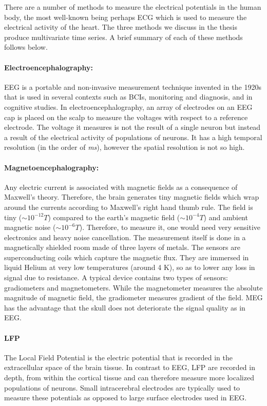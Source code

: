 There are a number of methods to measure the electrical potentials in the human body, the most well-known being perhaps \ac{ECG} which is used to measure the electrical activity of the heart. The three methods we discuss in the thesis produce multivariate time series. A brief summary of each of these methods follows below.

\paragraph{Electroencephalography: } \Ac{EEG} is a portable and non-invasive measurement technique invented in the 1920s that is  used in several contexts such as \acp{BCI}, monitoring and diagnosis, and in cognitive studies. 
In electroencephalography, an array of electrodes on an \ac{EEG} cap is placed on the scalp to measure the voltages with respect to a reference electrode. 
The voltage it measures is not the result of a single neuron but instead a result of the electrical activity of populations of  neurons. It has a high temporal resolution (in the order of \emph{ms}), however the spatial resolution is not so high.

\paragraph{Magnetoencephalography: } Any electric current is associated with magnetic fields as a consequence of Maxwell's theory. 
Therefore, the brain generates tiny magnetic fields which  wrap around the currents according to Maxwell's right hand thumb rule. The field is tiny ($\sim10^{-12}T$) compared to the earth's magnetic field ($\sim10^{-4}T$) and ambient magnetic noise ($\sim10^{-6}T$). Therefore, to measure it, one would need very sensitive electronics and heavy noise cancellation. The measurement itself is done in a magnetically shielded room made of three layers of metals. 
The sensors are superconducting coils which capture the magnetic flux. 
They are immersed in liquid Helium at very low temperatures (around 4 K), so as to lower any loss in signal due to resistance. A typical device contains two types of sensors: gradiometers and magnetometers. While the magnetometer measures the absolute magnitude of magnetic field, the gradiometer measures gradient of the field. \Ac{MEG} has the advantage that the skull does not deteriorate the signal quality as in \ac{EEG}.

\paragraph{\Ac{LFP}}
The Local Field Potential is the electric potential that is recorded in the extracellular space of the brain tissue. In contrast to \ac{EEG}, \ac{LFP} are recorded in depth, from within the cortical tissue and can therefore measure more localized populations of neurons. Small intracerebral electrodes are typically used to measure these potentials as opposed to large surface electrodes used in \ac{EEG}.

